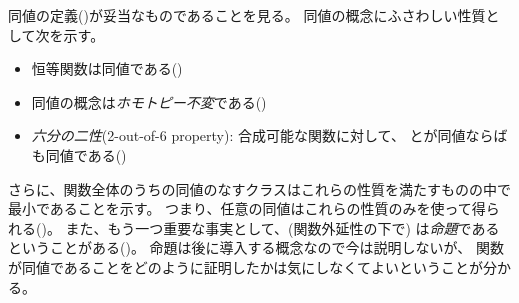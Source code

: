 \documentclass[index]{subfiles}
\begin{document}

同値の定義()が妥当なものであることを見る。
同値の概念にふさわしい性質として次を示す。
\begin{itemize}
\item 恒等関数は同値である()
\item 同値の概念は\emph{ホモトピー不変}である()
\item \emph{六分の二性}(2-out-of-6 property):
  合成可能な関数に対して、
  とが同値ならば
  も同値である()
\end{itemize}
さらに、関数全体のうちの同値のなすクラスはこれらの性質を満たすものの中で最小であることを示す。
つまり、任意の同値はこれらの性質のみを使って得られる()。
また、もう一つ重要な事実として、(関数外延性の下で)
は\emph{命題}であるということがある()。
命題は後に導入する概念なので今は説明しないが、
関数が同値であることをどのように証明したかは気にしなくてよいということが分かる。









\end{document}

